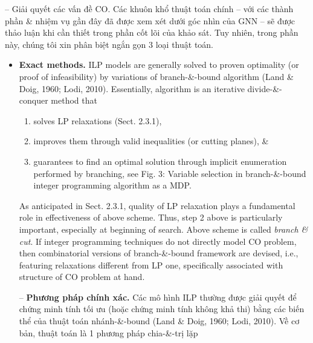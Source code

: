 \documentclass{article}
\begin{document}
\begin{itemize}
\begin{itemize}
\begin{itemize}
            -- {\sf Giải quyết các vấn đề CO.} Các khuôn khổ thuật toán chính -- với các thành phần \& nhiệm vụ gần đây đã được xem xét dưới góc nhìn của GNN -- sẽ được thảo luận khi cần thiết trong phần cốt lõi của khảo sát. Tuy nhiên, trong phần này, chúng tôi xin phân biệt ngắn gọn 3 loại thuật toán.
            \begin{itemize}
                \item {\bf Exact methods.} ILP models are generally solved to proven optimality (or proof of infeasibility) by variations of branch-\&-bound algorithm (Land \& Doig, 1960; Lodi, 2010). Essentially, algorithm is an iterative divide-\&-conquer method that
                \begin{enumerate}
                    \item solves LP relaxations (Sect. 2.3.1),
                    \item improves them through valid inequalities (or cutting planes), \&
                    \item guarantees to find an optimal solution through implicit enumeration performed by branching, see {\sf Fig. 3: Variable selection in branch-\&-bound integer programming algorithm as a MDP.}
                \end{enumerate}
                As anticipated in Sect. 2.3.1, quality of LP relaxation plays a fundamental role in effectiveness of above scheme. Thus, step 2 above is particularly important, especially at beginning of search. Above scheme is called {\it branch \& cut}. If integer programming techniques do not directly model CO problem, then combinatorial versions of branch-\&-bound framework are devised, i.e., featuring relaxations different from LP one, specifically associated with structure of CO problem at hand.

                -- {\bf Phương pháp chính xác.} Các mô hình ILP thường được giải quyết để chứng minh tính tối ưu (hoặc chứng minh tính không khả thi) bằng các biến thể của thuật toán nhánh-\&-bound (Land \& Doig, 1960; Lodi, 2010). Về cơ bản, thuật toán là 1 phương pháp chia-\&-trị lặp


\end{itemize}
\end{itemize}
\end{itemize}
\end{itemize}
\end{document}
